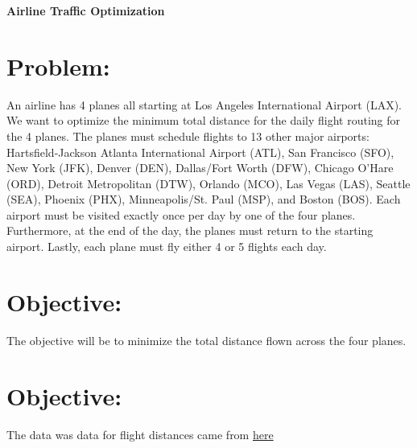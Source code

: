 \documentclass[12pt]{extarticle}
\begin{document}
\begin{center}
\textbf{Airline Traffic Optimization}
\end{center}
\section*{\small Problem:}
\hspace{1cm}
An airline has 4 planes all starting at Los Angeles International Airport (LAX). We want to optimize the minimum total distance for the daily flight routing for the 4 planes. The planes must schedule flights to 13 other major airports: Hartsfield-Jackson Atlanta International Airport (ATL), San Francisco (SFO), New York (JFK), Denver (DEN), Dallas/Fort Worth (DFW), Chicago O'Hare (ORD), Detroit Metropolitan (DTW), Orlando (MCO), Las Vegas (LAS), Seattle (SEA), Phoenix (PHX), Minneapolis/St. Paul (MSP), and Boston (BOS). Each airport must be visited exactly once per day by one of the four planes. Furthermore, at the end of the day, the planes must return to the starting airport. Lastly, each plane must fly either 4 or 5 flights each day.

\section*{\small Objective:}
\hspace{1cm} The objective will be to minimize the total distance flown across the four planes.

\section*{\small Objective:}
The data was data for flight distances came from \href{https://www.airmilescalculator.com/
}{here}
\end{document}
